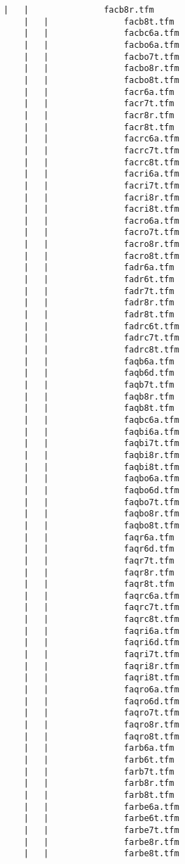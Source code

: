 \begin{lstlisting}[frame=tb, extendedchars=false, breaklines=false, basicstyle=\footnotesize\upshape ,columns=flexible ,keepspaces=true , lineskip={-7.0pt} ]
    |   |               facb8r.tfm
    |   |               facb8t.tfm
    |   |               facbc6a.tfm
    |   |               facbo6a.tfm
    |   |               facbo7t.tfm
    |   |               facbo8r.tfm
    |   |               facbo8t.tfm
    |   |               facr6a.tfm
    |   |               facr7t.tfm
    |   |               facr8r.tfm
    |   |               facr8t.tfm
    |   |               facrc6a.tfm
    |   |               facrc7t.tfm
    |   |               facrc8t.tfm
    |   |               facri6a.tfm
    |   |               facri7t.tfm
    |   |               facri8r.tfm
    |   |               facri8t.tfm
    |   |               facro6a.tfm
    |   |               facro7t.tfm
    |   |               facro8r.tfm
    |   |               facro8t.tfm
    |   |               fadr6a.tfm
    |   |               fadr6t.tfm
    |   |               fadr7t.tfm
    |   |               fadr8r.tfm
    |   |               fadr8t.tfm
    |   |               fadrc6t.tfm
    |   |               fadrc7t.tfm
    |   |               fadrc8t.tfm
    |   |               faqb6a.tfm
    |   |               faqb6d.tfm
    |   |               faqb7t.tfm
    |   |               faqb8r.tfm
    |   |               faqb8t.tfm
    |   |               faqbc6a.tfm
    |   |               faqbi6a.tfm
    |   |               faqbi7t.tfm
    |   |               faqbi8r.tfm
    |   |               faqbi8t.tfm
    |   |               faqbo6a.tfm
    |   |               faqbo6d.tfm
    |   |               faqbo7t.tfm
    |   |               faqbo8r.tfm
    |   |               faqbo8t.tfm
    |   |               faqr6a.tfm
    |   |               faqr6d.tfm
    |   |               faqr7t.tfm
    |   |               faqr8r.tfm
    |   |               faqr8t.tfm
    |   |               faqrc6a.tfm
    |   |               faqrc7t.tfm
    |   |               faqrc8t.tfm
    |   |               faqri6a.tfm
    |   |               faqri6d.tfm
    |   |               faqri7t.tfm
    |   |               faqri8r.tfm
    |   |               faqri8t.tfm
    |   |               faqro6a.tfm
    |   |               faqro6d.tfm
    |   |               faqro7t.tfm
    |   |               faqro8r.tfm
    |   |               faqro8t.tfm
    |   |               farb6a.tfm
    |   |               farb6t.tfm
    |   |               farb7t.tfm
    |   |               farb8r.tfm
    |   |               farb8t.tfm
    |   |               farbe6a.tfm
    |   |               farbe6t.tfm
    |   |               farbe7t.tfm
    |   |               farbe8r.tfm
    |   |               farbe8t.tfm

\end{lstlisting}
